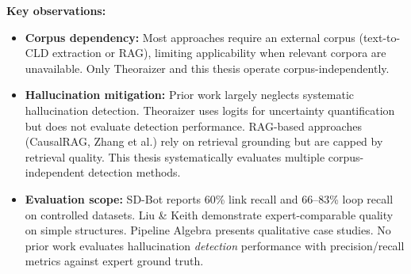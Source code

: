 \noindent\textbf{Key observations:}

\begin{itemize}[noitemsep]
    \item \textbf{Corpus dependency:} Most approaches require an external corpus (text-to-CLD extraction or RAG), limiting applicability when relevant corpora are unavailable. Only Theoraizer and this thesis operate corpus-independently.
    
    \item \textbf{Hallucination mitigation:} Prior work largely neglects systematic hallucination detection. Theoraizer uses logits for uncertainty quantification but does not evaluate detection performance. RAG-based approaches (CausalRAG, Zhang et al.) rely on retrieval grounding but are capped by retrieval quality. This thesis systematically evaluates multiple corpus-independent detection methods.
    
    \item \textbf{Evaluation scope:} SD-Bot reports 60\% link recall and 66--83\% loop recall on controlled datasets. Liu \& Keith demonstrate expert-comparable quality on simple structures. Pipeline Algebra presents qualitative case studies. No prior work evaluates hallucination \emph{detection} performance with precision/recall metrics against expert ground truth.
\end{itemize}






